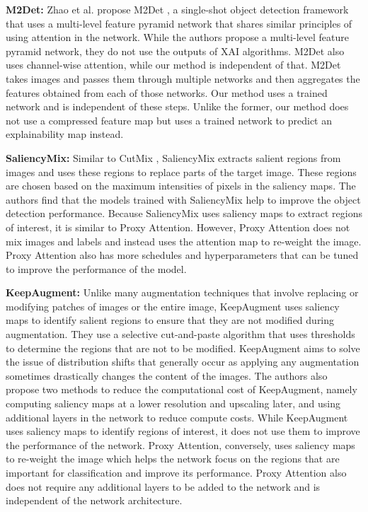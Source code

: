 \documentclass[a4paper,11pt,openright]{book}
\begin{document}
\textbf{M2Det: }
Zhao et al. propose M2Det \cite{zhaoM2DetSingleShotObject2019}, a single-shot object detection framework that uses a multi-level feature pyramid network that shares similar principles of using attention in the network. While the authors propose a multi-level feature pyramid network, they do not use the outputs of XAI algorithms. M2Det also uses channel-wise attention, while our method is independent of that. M2Det takes images and passes them through multiple networks and then aggregates the features obtained from each of those networks. Our method uses a trained network and is independent of these steps. Unlike the former, our method does not use a compressed feature map but uses a trained network to predict an explainability map instead.

\textbf{SaliencyMix: }
Similar to CutMix \cite{yunCutMixRegularizationStrategy2019}, SaliencyMix \cite{uddinSaliencyMixSaliencyGuided2021} extracts salient regions from images and uses these regions to replace parts of the target image. These regions are chosen based on the maximum intensities of pixels in the saliency maps. The authors find that the models trained with SaliencyMix help to improve the object detection performance. Because SaliencyMix uses saliency maps to extract regions of interest, it is similar to Proxy Attention. However, Proxy Attention does not mix images and labels and instead uses the attention map to re-weight the image. Proxy Attention also has more schedules and hyperparameters that can be tuned to improve the performance of the model.

\textbf{KeepAugment: }
Unlike many augmentation techniques that involve replacing or modifying patches of images or the entire image, KeepAugment \cite{gongKeepAugmentSimpleInformationPreserving2021} uses saliency maps to identify salient regions to ensure that they are not modified during augmentation. They use a selective cut-and-paste algorithm that uses thresholds to determine the regions that are not to be modified. KeepAugment aims to solve the issue of distribution shifts that generally occur as applying any augmentation sometimes drastically changes the content of the images. The authors also propose two methods to reduce the computational cost of KeepAugment, namely computing saliency maps at a lower resolution and upscaling later, and using additional layers in the network to reduce compute costs. While KeepAugment uses saliency maps to identify regions of interest, it does not use them to improve the performance of the network. Proxy Attention, conversely, uses saliency maps to re-weight the image which helps the network focus on the regions that are important for classification and improve its performance. Proxy Attention also does not require any additional layers to be added to the network and is independent of the network architecture.
\end{document}
